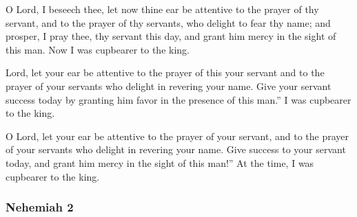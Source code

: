 			\begin{versebox}
					\item[BHS] 
					\item[LXX] 
					\item[ASV] O Lord, I beseech thee, let now thine ear be attentive to the prayer of thy servant, and to the prayer of thy servants, who delight to fear thy name; and prosper, I pray thee, thy servant this day, and grant him mercy in the sight of this man. Now I was cupbearer to the king.
					\item[NIV] Lord, let your ear be attentive to the prayer of this your servant and to the prayer of your servants who delight in revering your name. Give your servant success today by granting him favor in the presence of this man.” I was cupbearer to the king.
					\item[NRSV] O Lord, let your ear be attentive to the prayer of your servant, and to the prayer of your servants who delight in revering your name. Give success to your servant today, and grant him mercy in the sight of this man!” At the time, I was cupbearer to the king.
			\end{versebox}
	\subsubsection{Nehemiah 2} %
		\label{NEHEMIAH-2}

